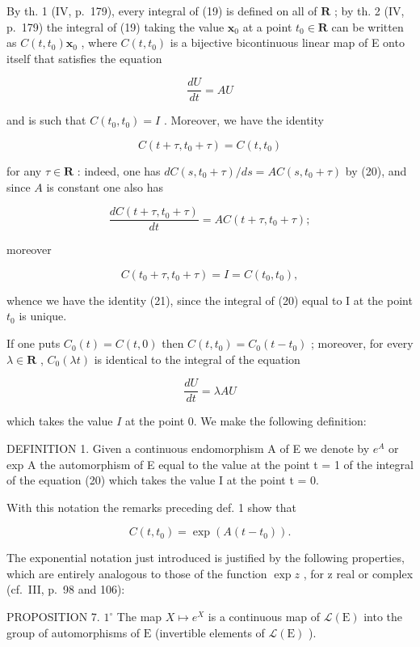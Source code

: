 By th. 1 (IV, p.~179), every integral of (19) is defined on all of \(\mathbf{R}\) ; by th. 2 (IV, p.~179) the integral of (19) taking the value \(\mathbf{x}_0\) at a point \(t_0 \in \mathbf{R}\) can be written as \(C(t, t_0)\mathbf{x}_0\) , where \(C(t, t_0)\) is a bijective bicontinuous linear map of E onto itself that satisfies the equation

\[
\frac {d U}{d t} = A U\tag{20}
\]

and is such that \(C(t_0, t_0) = I\) . Moreover, we have the identity

\[
C (t + \tau , t _ {0} + \tau) = C (t, t _ {0})\tag{21}
\]

for any \(\tau \in \mathbf{R}\) : indeed, one has \(dC(s, t_0 + \tau) / ds = AC(s, t_0 + \tau)\) by (20), and since \(A\) is constant one also has

\[
\frac {d C (t + \tau , t _ {0} + \tau)}{d t} = A C (t + \tau , t _ {0} + \tau);
\]

moreover

\[
C (t _ {0} + \tau , t _ {0} + \tau) = I = C (t _ {0}, t _ {0}),
\]

whence we have the identity (21), since the integral of (20) equal to I at the point \(t_{0}\) is unique.

If one puts \(C_0(t) = C(t, 0)\) then \(C(t, t_0) = C_0(t - t_0)\) ; moreover, for every \(\lambda \in \mathbf{R}\) , \(C_0(\lambda t)\) is identical to the integral of the equation

\[
\frac {d U}{d t} = \lambda A U\tag{22}
\]

which takes the value \(I\) at the point 0. We make the following definition:

DEFINITION 1. Given a continuous endomorphism A of E we denote by \(e^{A}\) or exp A the automorphism of E equal to the value at the point t = 1 of the integral of the equation (20) which takes the value I at the point t = 0.

With this notation the remarks preceding def. 1 show that

\[
C (t, t _ {0}) = \exp \left(A (t - t _ {0})\right).\tag{23}
\]

The exponential notation just introduced is justified by the following properties, which are entirely analogous to those of the function \(\exp z\) , for z real or complex (cf.~III, p.~98 and 106):

PROPOSITION 7. \(1^{\circ}\) The map \(X \mapsto e^{X}\) is a continuous map of \(\mathcal{L}(\mathrm{E})\) into the group of automorphisms of \(\mathrm{E}\) (invertible elements of \(\mathcal{L}(\mathrm{E})\) ).

